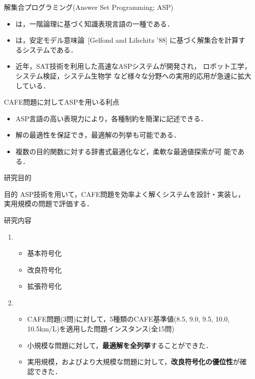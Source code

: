 \documentclass[dvipdfmx, 11pt]{beamer}
\begin{document}
\begin{frame}{解集合プログラミング(Answer Set Programming; ASP)}
 \begin{itemize}
 \item {}は，一階論理に基づく知識表現言語の一種である．
 \item {}は，安定モデル意味論~[Gelfond and Lifschitz '88]
   に基づく解集合を計算するシステムである．
 \item 近年，SAT技術を利用した高速なASPシステムが開発され，
   ロボット工学，システム検証，システム生物学
   など様々な分野への実用的応用が急速に拡大している．
 \end{itemize}
\vfill
 \begin{alertblock}{CAFE問題に対してASPを用いる利点}
   \begin{itemize} 
    \item ASP言語の高い表現力により，各種制約を簡潔に記述できる．
    \item 解の最適性を保証でき，最適解の列挙も可能である．
    \item 複数の目的関数に対する辞書式最適化など，柔軟な最適値探索が可
      能である．
   \end{itemize}
 \end{alertblock}
\end{frame}
\begin{frame}{研究目的}
  \begin{alertblock}{目的}
    ASP技術を用いて，CAFE問題を効率よく解くシステムを設計・実装し，
    実用規模の問題で評価する．
  \end{alertblock}
  \vfill
  \begin{block}{研究内容}
    \begin{enumerate}
    \item {}
      \begin{itemize}
      \item 基本符号化
      \item 改良符号化
      \item 拡張符号化
      \end{itemize}
    \item {}
      \begin{itemize}
      \item CAFE問題(3問)に対して，5種類のCAFE基準値(8.5, 9.0, 9.5,
        10.0, 10.5km/L)を適用した問題インスタンス(全15問)       
      \item 小規模な問題に対して，\textbf{最適解を全列挙}することができた．
      \item 実用規模，およびより大規模な問題に対して，\textbf{改良符号化の優位性}が確認できた．
      \end{itemize}
  \end{enumerate}
 \end{block}
\end{frame}
\end{document}
